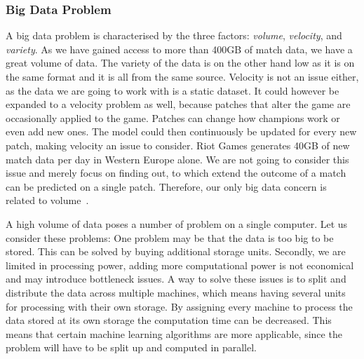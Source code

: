 \subsubsection{Big Data Problem}\label{sec:big_data_problem}
A big data problem is characterised by the three factors: \emph{volume}, \emph{velocity}, and \emph{variety}. As we have gained access to more than 400GB of match data, we have a great volume of data. The variety of the data is on the other hand low as it is on the same format and it is all from the same source. Velocity is not an issue either, as the data we are going to work with is a static dataset. It could however be expanded to a velocity problem as well, because patches that alter the game are occasionally applied to the game. Patches can change how champions work or even add new ones. The model could then continuously be updated for every new patch, making velocity an issue to consider. Riot Games generates 40GB of new match data per day in Western Europe alone. We are not going to consider this issue and merely focus on finding out, to which extend the outcome of a match can be predicted on a single patch. Therefore, our only big data concern is related to volume~\cite{madden2012databases}.

A high volume of data poses a number of problem on a single computer. Let us consider these problems: One problem may be that the data is too big to be stored. This can be solved by buying additional storage units. Secondly, we are limited in processing power, adding more computational power is not economical and may introduce bottleneck issues. A way to solve these issues is to split and distribute the data across multiple machines, which means having several units for processing with their own storage. By assigning every machine to process the data stored at its own storage the computation time can be decreased.
This means that certain machine learning algorithms are more applicable, since the problem will have to be split up and computed in parallel. 


